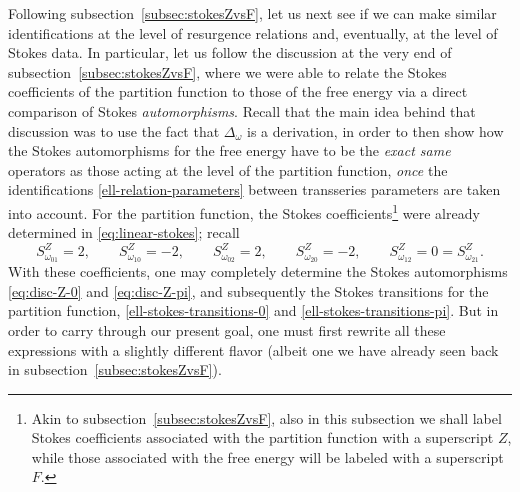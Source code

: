\documentclass[11pt,a4paper]{article}
\newcommand{\be}{\begin{equation}}
\newcommand{\ee}{\end{equation}}
\begin{document}
Following subsection~\ref{subsec:stokesZvsF}, let us next see if we can make similar identifications at the level of resurgence relations and, eventually, at the level of Stokes data. In particular, let us follow the discussion at the very end of subsection~\ref{subsec:stokesZvsF}, where we were able to relate the Stokes coefficients of the partition function to those of the free energy via a direct comparison of Stokes \textit{automorphisms}. Recall that the main idea behind that discussion was to use the fact that $\Delta_\omega$ is a derivation, in order to then show how the Stokes automorphisms for the free energy have to be the \textit{exact same} operators as those acting at the level of the partition function, \textit{once} the identifications \eqref{ell-relation-parameters} between transseries parameters are taken into account. For the partition function, the Stokes coefficients\footnote{Akin to subsection~\ref{subsec:stokesZvsF}, also in this subsection we shall label Stokes coefficients associated with the partition function with a superscript $Z$, while those associated with the free energy will be labeled with a superscript $F$.} were already determined in \eqref{eq:linear-stokes}; recall
%
\be
S_{\omega_{01}}^Z = 2, 
\qquad 
S_{\omega_{10}}^Z = - 2, 
\qquad 
S_{\omega_{02}}^Z = 2, 
\qquad 
S_{\omega_{20}}^Z = - 2, 
\qquad 
S_{\omega_{12}}^Z = 0 = S_{\omega_{21}}^Z.
\ee
%
\noindent
With these coefficients, one may completely determine the Stokes automorphisms \eqref{eq:disc-Z-0} and \eqref{eq:disc-Z-pi}, and subsequently the Stokes transitions for the partition function, \eqref{ell-stokes-transitions-0} and \eqref{ell-stokes-transitions-pi}. But in order to carry through our present goal, one must first rewrite all these expressions with a slightly different flavor (albeit one we have already seen back in subsection~\ref{subsec:stokesZvsF}).
\end{document}
